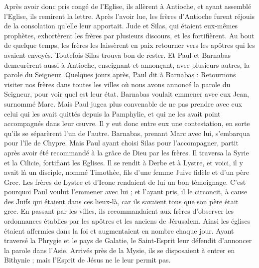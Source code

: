 \begin{multicols}{2}
Après avoir donc pris congé de l’Eglise, ils allèrent à Antioche, et ayant assemblé l'Eglise, ils remirent la lettre.
Après l’avoir lue, les frères d’Antioche furent réjouis de la consolation qu’elle leur apportait.
Jude et Silas, qui étaient eux-mêmes prophètes, exhortèrent les frères par plusieurs discours, et les fortifièrent.
Au bout de quelque temps, les frères les laissèrent en paix retourner vers les apôtres qui les avaient envoyés.
Toutefois Silas trouva bon de rester.
Et Paul et Barnabas demeurèrent aussi à Antioche, enseignant et annonçant, avec plusieurs autres, la parole du Seigneur.
Quelques jours après, Paul dit à Barnabas : Retournons visiter nos frères dans toutes les villes où nous avons annoncé la parole du Seigneur, pour voir quel est leur état.
Barnabas voulait emmener avec eux Jean, surnommé Marc.
Mais Paul jugea plus convenable de ne pas prendre avec eux celui qui les avait quittés depuis la Pamphylie, et qui ne les avait point accompagnés dans leur œuvre.
Il y eut donc entre eux une contestation, en sorte qu’ils se séparèrent l’un de l’autre. Barnabas, prenant Marc avec lui, s’embarqua pour l’île de Chypre.
Mais Paul ayant choisi Silas pour l'accompagner, partit après avoir été recommandé à la grâce de Dieu par les frères.
Il traversa la Syrie et la Cilicie, fortifiant les Eglises.
\VerseOne{}Il se rendit à Derbe et à Lystre, et voici, il y avait là un disciple, nommé Timothée, fils d'une femme Juive fidèle et d'un père Grec.
Les frères de Lystre et d’Icone rendaient de lui un bon témoignage.
C'est pourquoi Paul voulut l’emmener avec lui ; et l'ayant pris, il le circoncit, à cause des Juifs qui étaient dans ces lieux-là, car ils savaient tous que son père était grec.
En passant par les villes, ils recommandaient aux frères d’observer les ordonnances établies par les apôtres et les anciens de Jérusalem.
Ainsi les églises étaient affermies dans la foi et augmentaient en nombre chaque jour.
Ayant traversé la Phrygie et le pays de Galatie, le Saint-Esprit leur défendit d'annoncer la parole dans l’Asie.
Arrivés près de la Mysie, ils se disposaient à entrer en Bithynie ; mais l'Esprit de Jésus ne le leur permit pas.

\end{multicols}
